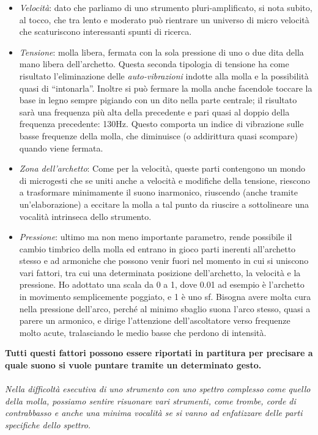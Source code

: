 \begin{itemize}
\item{\textit{Velocità}: dato che parliamo di uno strumento pluri-amplificato, si nota subito, al tocco, che tra lento e moderato può rientrare un universo di micro velocità che scaturiscono interessanti spunti di ricerca.}

\item{\textit{Tensione}: molla libera, fermata con la sola pressione di uno o due dita della mano libera dell’archetto. Questa seconda tipologia di tensione ha come risultato l’eliminazione delle \textit{auto-vibrazioni} indotte alla molla e la possibilità quasi di “intonarla”. Inoltre si può fermare la molla anche facendole toccare la base in legno sempre pigiando con un dito nella parte centrale; il risultato sarà una frequenza più alta della precedente e pari quasi al doppio della frequenza precedente: 130Hz. Questo comporta un indice di vibrazione sulle basse frequenze della molla, che diminuisce (o addirittura quasi scompare) quando viene fermata.}
\item{\textit{Zona dell’archetto}: Come per la velocità, queste parti contengono un mondo di microgesti che se uniti anche a velocità e modifiche della tensione, riescono a trasformare minimamente il suono inarmonico, riuscendo (anche tramite un’elaborazione) a eccitare la molla a tal punto da riuscire a sottolineare una vocalità intrinseca dello strumento.}
\item{\textit{Pressione}: ultimo ma non meno importante parametro, rende possibile il cambio timbrico della molla ed entrano in gioco parti inerenti all’archetto stesso e ad armoniche che possono venir fuori nel momento in cui si uniscono vari fattori, tra cui una determinata posizione dell’archetto, la velocità e la pressione. Ho adottato una scala da 0 a 1, dove 0.01 ad esempio è l’archetto in movimento semplicemente poggiato, e 1 è uno sf.
Bisogna avere molta cura nella pressione dell’arco, perché al minimo sbaglio suona l’arco stesso, quasi a parere un armonico, e dirige l’attenzione dell’ascoltatore verso frequenze molto acute, tralasciando le medio basse che perdono di intensità.}
\end{itemize}
\textbf{Tutti questi fattori possono essere riportati in partitura per precisare a quale suono si vuole puntare tramite un determinato gesto.} \\
\\
\textit{Nella difficoltà esecutiva di uno strumento con uno spettro complesso come quello della molla, possiamo sentire risuonare vari strumenti, come trombe, corde di contrabbasso e anche una minima vocalità se si vanno ad enfatizzare delle parti specifiche dello spettro.}



